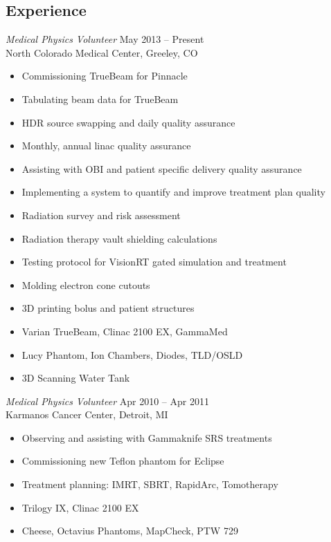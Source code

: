 \documentclass[margin]{res}
\begin{document}
\begin{resume}
\section{Experience} 
{\sl Medical Physics Volunteer} \hfill May 2013 -- Present \\
North Colorado Medical Center, Greeley, CO
 \begin{itemize}  \itemsep -2pt %
    \item Commissioning TrueBeam for Pinnacle
    \item Tabulating beam data for TrueBeam
    \item HDR source swapping and daily quality assurance
    \item Monthly, annual linac quality assurance
    \item Assisting with OBI and patient specific delivery quality assurance
    \item Implementing a system to quantify and improve treatment plan quality
    \item Radiation survey and risk assessment
    \item Radiation therapy vault shielding calculations
    \item Testing protocol for VisionRT gated simulation and treatment
    \item Molding electron cone cutouts
    \item 3D printing bolus and patient structures
    \item Varian TrueBeam, Clinac 2100 EX, GammaMed
    \item Lucy Phantom, Ion Chambers, Diodes, TLD/OSLD
    \item 3D Scanning Water Tank
\end{itemize}

{\sl Medical Physics Volunteer} \hfill Apr 2010 -- Apr 2011 \\
Karmanos Cancer Center, Detroit, MI
 \begin{itemize}  \itemsep -2pt %
    \item Observing and assisting with Gammaknife SRS treatments
    \item Commissioning new Teflon phantom for Eclipse
    \item Treatment planning: IMRT, SBRT, RapidArc, Tomotherapy
    \item Trilogy IX, Clinac 2100 EX
    \item Cheese, Octavius Phantoms, MapCheck, PTW 729
\end{itemize}


\end{resume}
\end{document}
